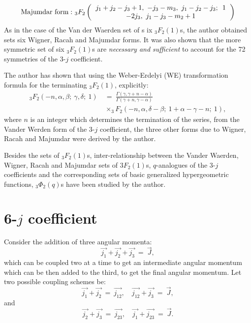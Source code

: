 \begin{equation}
{\rm Majumdar\ form:}\ {}_3F_2
\left(
\begin{tabular}{c}
$j_1+j_2-j_3+1,\ -j_3-m_3,\ j_1-j_2-j_3;$ \ 1\\
$-2j_3,\ j_1-j_3-m_2+1$  \\ 
\end{tabular} 
\right) \label{chap29-eq18}
\end{equation}
As in the case of the Van der Waerden set of s ix $_3F_2(1)$s, the author obtained
sets six Wigner, Racah and Majumdar forms. It was also shown that the more symmetric
set of six $_3F_2(1)$s are \textit{necessary and sufficient} to account for the 72 
symmetries of the 3-$j$ coefficient.

The author has shown that using the Weber-Erdelyi (WE) transformation formula
for the terminating $_3F_2(1)$, explicitly:
\begin{equation}
\begin{split}
_3F_2(-n,\alpha,\beta ;\ \gamma,\delta;\ 1)\ & = \ \frac{\Gamma(\gamma, \gamma +n-\alpha )} {\Gamma(\gamma +n, \gamma -\alpha )}\\
& \times _3F_2(-n,\alpha,\delta -\beta;\ 1+\alpha -\gamma -n;\ 1), \label{chap29-eq19}
\end{split}
\end{equation}
where $n$ is an integer which determines the termination of the series, from 
the Vander Werden form of the 3-$j$ coefficient, the three other forms due to 
Wigner, Racah and Majumdar were derived by the author.

Besides the sets of $_3F_2(1)$s, inter-relationship between the Vander Waerden,
Wigner, Racah and Majumdar sets of $3F_2(1)$s,  $q$-analogues of the 3-$j$ coefficients
and the corresponding sets of basic generalized hypergeometric functions, $_3\Phi_2(q)$s
have been studied by the author.

\section*{\bf 6-$j$ coefficient}

Consider the addition of three angular momenta:
\begin{equation}
\vec{j_1} + \vec{j_2} + \vec{j_3} \ =\ \vec{J}, \label{chap29-eq20}
\end{equation}
which can be coupled two at a time to get an intermediate angular momentum which can
be then added to the third, to get the final angular momentum. Let two possible coupling 
schemes be:
\begin{equation}
\vec{j_1} + \vec{j_2}\ =\ \vec{j_{12}}, \quad  \vec{j_{12}} + \vec{j_3} \ =\ \vec{J}, \label{chap29-eq21}
\end{equation}
and 
\begin{equation}
\vec{j_2} + \vec{j_3}\ =\ \vec{j_{23}}, \quad  \vec{j_1} + \vec{j_{23}} \ =\ \vec{J}. \label{chap29-eq22}
\end{equation}

